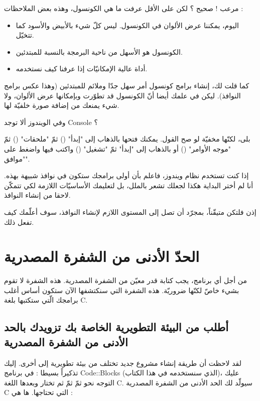 
مرعب ! صحيح ؟ لكن على الأقل عرفت ما هي الكونسول، وهذه بعض الملاحظات :
\begin{itemize}
  \item اليوم، يمكننا عرض الألوان في الكونسول. ليس كلّ شيء بالأبيض والأسود كما تتخيّل.
  \item الكونسول هو الأسهل من ناحية البرمجة بالنسبة للمبتدئين.
  \item أداة عالية الإمكانيّات إذا عرفنا كيف نستخدمه.
\end{itemize}

كما قلت لك، إنشاء برامج كونسول أمر سهل جدّا وملائم للمبتدئين (وهذا عكس برامج النوافذ). ليكن في علمك أيضا أنّ الكونسول قد تطوّرت وبإمكانها عرض الألوان، ولا شيء يمنعك من إضافة صورة خلفيّة لها.

\begin{question}
  وفي الويندوز ألا توجد
\textenglish{Console}
 ؟
\end{question}

بلى، لكنّها مخفيّة لو صح القول. يمكنك فتحها بالذهاب إلى "إبدأ"
()
 ثمّ "ملحقات"
()
 ثمّ "موجه الأوامر"
()
 أو بالذهاب إلى "إبدأ" ثمّ "تشغيل"
()
 واكتب فيها
 واضغط على "موافق".


إذا كنت تستخدم نظام ويندوز، فاعلم بأن أولى برامجك ستكون في نوافذ شبيهة بهذه. أنا لم أختر البداية هكذا لجعلك تشعر بالملل، بل لتعليمك الأساسيّات اللازمة لكي تتمكّن لاحقا من إنشاء النوافذ.

إذن فلتكن متيقّناً، بمجرّد أن تصل إلى المستوى اللازم لإنشاء النوافذ، سوف أعلّمك كيف تفعل ذلك.

\section{الحدّ الأدنى من الشفرة المصدرية}
من أجل أي برنامج، يجب كتابة قدر معيّن من الشفرة المصدرية. هذه الشفرة لا تقوم بشيء خاصّ لكنّها ضروريّة. هذه الشفرة التي سنكتشفها الآن ستكون أساس أغلب برامجك الّتي ستكتبها بلغة \textenglish{C}.

\subsection{أطلب من البيئة التطويرية الخاصة بك تزويدك بالحد الأدنى من الشفرة المصدرية}
لقد لاحظت أن طريقة إنشاء مشروع جديد تختلف من بيئة تطويرية إلى أخرى. إليك تذكيراً بسيطا : في برنامج
\textenglish{Code::Blocks}
 (الذي سنستخدمه في هذا الكتاب)، عليك التوجه نحو
 ثمّ
 ثمّ
 ثم تختار
 وبعدها اللغة
\textenglish{C}.
سيولّد لك الحد الأدنى من الشفرة المصدرية
 \textenglish{C}
 التي تحتاجها. ها هي :

